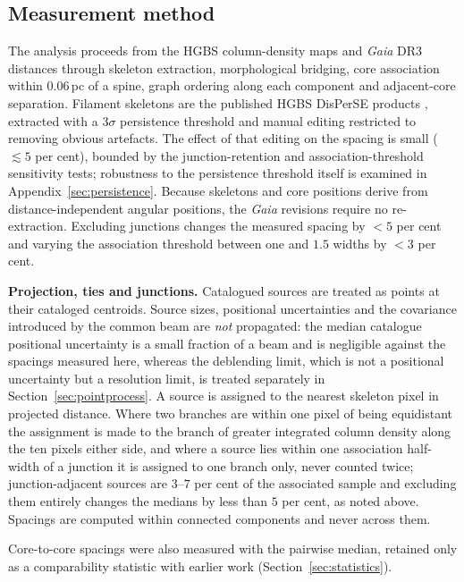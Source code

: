 \documentclass[usenatbib,twoside,twocolumn]{mnras}
\begin{document}
\subsection{Measurement method}
\label{sec:methodology}

The analysis proceeds from the HGBS column-density maps and \textit{Gaia} DR3 distances through skeleton extraction, morphological bridging, core association within $0.06$\,pc of a spine, graph ordering along each component and adjacent-core separation. Filament skeletons are the published HGBS DisPerSE products \citep{Sousbie2011,Arzoumanian2011}, extracted with a $3\sigma$ persistence threshold and manual editing restricted to removing obvious artefacts. The effect of that editing on the spacing is small ($\lesssim5$ per cent), bounded by the junction-retention and association-threshold sensitivity tests; robustness to the persistence threshold itself is examined in Appendix~\ref{sec:persistence}. Because skeletons and core positions derive from distance-independent angular positions, the \textit{Gaia} revisions require no re-extraction. Excluding junctions changes the measured spacing by $<5$ per cent and varying the association threshold between one and $1.5$ widths by $<3$ per cent.

\smallskip\noindent\textbf{Projection, ties and junctions.} Catalogued sources are treated as points at their cataloged centroids. Source sizes, positional uncertainties and the covariance introduced by the common beam are \emph{not} propagated: the median catalogue positional uncertainty is a small fraction of a beam and is negligible against the spacings measured here, whereas the deblending limit, which is not a positional uncertainty but a resolution limit, is treated separately in Section~\ref{sec:pointprocess}. A source is assigned to the nearest skeleton pixel in projected distance. Where two branches are within one pixel of being equidistant the assignment is made to the branch of greater integrated column density along the ten pixels either side, and where a source lies within one association half-width of a junction it is assigned to one branch only, never counted twice; junction-adjacent sources are $3$--$7$ per cent of the associated sample and excluding them entirely changes the medians by less than $5$ per cent, as noted above. Spacings are computed within connected components and never across them.

Core-to-core spacings were also measured with the pairwise median, retained only as a comparability statistic with earlier work (Section~\ref{sec:statistics}).
\end{document}
